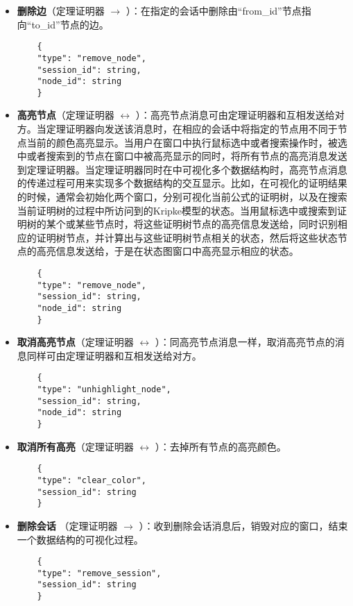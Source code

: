 \begin{itemize}
	\item \textbf{删除边}（定理证明器 $\longrightarrow$ ）：在指定的会话中删除由“from\_id”节点指向“to\_id”节点的边。
	\begin{verbatim}
	{
	"type": "remove_node",
	"session_id": string,
	"node_id": string
	}
	\end{verbatim}
	\item \textbf{高亮节点}（定理证明器 $\longleftrightarrow$ ）：高亮节点消息可由定理证明器和互相发送给对方。当定理证明器向发送该消息时，在相应的会话中将指定的节点用不同于节点当前的颜色高亮显示。当用户在窗口中执行鼠标选中或者搜索操作时，被选中或者搜索到的节点在窗口中被高亮显示的同时，将所有节点的高亮消息发送到定理证明器。当定理证明器同时在中可视化多个数据结构时，高亮节点消息的传递过程可用来实现多个数据结构的交互显示。比如，在可视化\sctlprov{}的证明结果的时候，通常会初始化两个窗口，分别可视化当前公式的证明树，以及在搜索当前证明树的过程中所访问到的Kripke模型的状态。当用鼠标选中或搜索到证明树的某个或某些节点时，将这些证明树节点的高亮信息发送给\sctlprov{}，同时\sctlprov{}识别相应的证明树节点，并计算出与这些证明树节点相关的状态，然后将这些状态节点的高亮信息发送给，于是在状态图窗口中高亮显示相应的状态。
	
	\begin{verbatim}
	{
	"type": "remove_node",
	"session_id": string,
	"node_id": string
	}
	\end{verbatim}
	\item \textbf{取消高亮节点}（定理证明器 $\longleftrightarrow$ ）：同高亮节点消息一样，取消高亮节点的消息同样可由定理证明器和互相发送给对方。
	\begin{verbatim}
	{
	"type": "unhighlight_node",
	"session_id": string,
	"node_id": string
	}
	\end{verbatim}
	\item \textbf{取消所有高亮}（定理证明器 $\longleftrightarrow$ ）：去掉所有节点的高亮颜色。
	\begin{verbatim}
	{
	"type": "clear_color",
	"session_id": string
	}
	\end{verbatim}
	\item \textbf{删除会话} （定理证明器 $\longrightarrow$ ）：收到删除会话消息后，销毁对应的窗口，结束一个数据结构的可视化过程。
	\begin{verbatim}
	{
	"type": "remove_session",
	"session_id": string
	}
	\end{verbatim}
\end{itemize}

